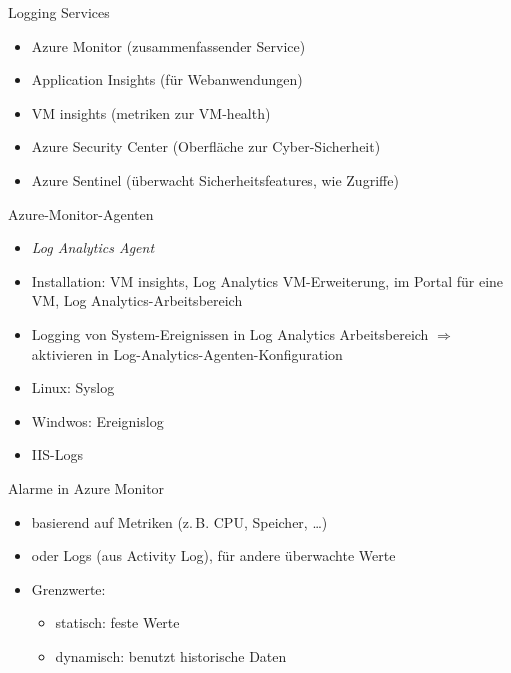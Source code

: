 
\begin{flashcard}[Definition]{Logging Services}
  \begin{itemize}
    \item Azure Monitor (zusammenfassender Service)
    \item Application Insights (für Webanwendungen)
    \item VM insights (metriken zur VM-health)
    \item Azure Security Center (Oberfläche zur Cyber-Sicherheit)
    \item Azure Sentinel (überwacht Sicherheitsfeatures, wie Zugriffe)
  \end{itemize}
\end{flashcard}

\begin{flashcard}[Definition]{Azure-Monitor-Agenten}
  \begin{itemize}
    \item \emph{Log Analytics Agent}
    \item Installation: VM insights, Log Analytics VM-Erweiterung, im Portal für eine VM, Log Analytics-Arbeitsbereich
    \item Logging von System-Ereignissen in Log Analytics Arbeitsbereich\newline
      $\Rightarrow$ aktivieren in Log-Analytics-Agenten-Konfiguration
    \item Linux: Syslog
    \item Windwos: Ereignislog
    \item IIS-Logs
  \end{itemize}
\end{flashcard}

\begin{flashcard}[Definition]{Alarme in Azure Monitor}
  \begin{itemize}
    \item basierend auf Metriken (z.\,B. CPU, Speicher, \ldots)
    \item oder Logs (aus Activity Log), für andere überwachte Werte
    \item Grenzwerte:
      \begin{itemize}
        \item statisch: feste Werte
        \item dynamisch: benutzt historische Daten
      \end{itemize}
  \end{itemize}
\end{flashcard}

